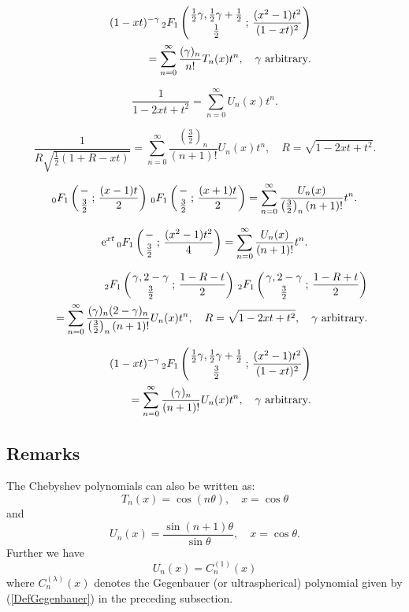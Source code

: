 \documentclass[envcountchap,graybox]{svmono}
\newcommand{\hyp}[5]{\mbox{}_{#1}{F}_{#2}
\left(\genfrac{}{}{0pt}{}{#3}{#4}\,;\,#5\right)}
\newcommand{\e}{\textrm{e}}
\begin{document}
\begin{eqnarray}
\label{GenChebyshevI6}
& &(1-xt)^{-\gamma}\,\hyp{2}{1}{\frac{1}{2}\gamma,\frac{1}{2}\gamma+\frac{1}{2}}{\frac{1}{2}}
{\frac{(x^2-1)t^2}{(1-xt)^2}}\nonumber\\
& &=\sum_{n=0}^{\infty}\frac{(\gamma)_n}{n!}T_n(x)t^n,\quad\textrm{$\gamma$ arbitrary}.
\end{eqnarray}

\begin{equation}
\label{GenChebyshevII1}
\frac{1}{1-2xt+t^2}=\sum_{n=0}^{\infty}U_n(x)t^n.
\end{equation}

\begin{equation}
\label{GenChebyshevII2}
\frac{1}{R\sqrt{\frac{1}{2}(1+R-xt)}}=\sum_{n=0}^{\infty}
\frac{\left(\frac{3}{2}\right)_n}{(n+1)!}U_n(x)t^n,\quad R=\sqrt{1-2xt+t^2}.
\end{equation}

\begin{equation}
\label{GenChebyshevII3}
\hyp{0}{1}{-}{\frac{3}{2}}{\frac{(x-1)t}{2}}\,
\hyp{0}{1}{-}{\frac{3}{2}}{\frac{(x+1)t}{2}}=
\sum_{n=0}^{\infty}\frac{U_n(x)}{\left(\frac{3}{2}\right)_n(n+1)!}t^n.
\end{equation}

\begin{equation}
\label{GenChebyshevII4}
\e^{xt}\,\hyp{0}{1}{-}{\frac{3}{2}}{\frac{(x^2-1)t^2}{4}}=
\sum_{n=0}^{\infty}\frac{U_n(x)}{(n+1)!}t^n.
\end{equation}

\begin{eqnarray}
\label{GenChebyshevII5}
& &\hyp{2}{1}{\gamma,2-\gamma}{\frac{3}{2}}{\frac{1-R-t}{2}}\,
\hyp{2}{1}{\gamma,2-\gamma}{\frac{3}{2}}{\frac{1-R+t}{2}}\nonumber\\
& &{}=\sum_{n=0}^{\infty}\frac{(\gamma)_n(2-\gamma)_n}{\left(\frac{3}{2}\right)_n(n+1)!}U_n(x)t^n,
\quad R=\sqrt{1-2xt+t^2},\quad\textrm{$\gamma$ arbitrary}.
\end{eqnarray}

\begin{eqnarray}
\label{GenChebyshevII6}
& &(1-xt)^{-\gamma}\,\hyp{2}{1}{\frac{1}{2}\gamma,\frac{1}{2}\gamma+\frac{1}{2}}{\frac{3}{2}}
{\frac{(x^2-1)t^2}{(1-xt)^2}}\nonumber\\
& &{}=\sum_{n=0}^{\infty}\frac{(\gamma)_n}{(n+1)!}U_n(x)t^n,\quad\textrm{$\gamma$ arbitrary}.
\end{eqnarray}

\subsection*{Remarks}
The Chebyshev polynomials can also be written as:
$$T_n(x)=\cos(n\theta),\quad x=\cos\theta$$
and
$$U_n(x)=\frac{\sin (n+1)\theta}{\sin\theta},\quad x=\cos\theta.$$
Further we have
$$U_n(x)=C_n^{(1)}(x)$$
where $C_n^{(\lambda)}(x)$ denotes the Gegenbauer (or ultraspherical)
polynomial given by (\ref{DefGegenbauer}) in the preceding subsection.
\end{document}
